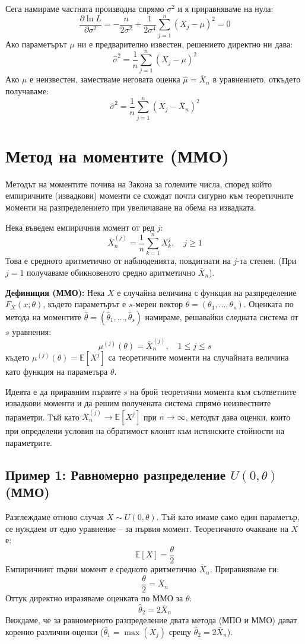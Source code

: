 \documentclass{article}
\begin{document}
Сега намираме частната производна спрямо $\sigma^2$ и я приравняваме на нула:
\[
    \frac{\partial \ln L}{\partial \sigma^2} = -\frac{n}{2\sigma^2} + \frac{1}{2\sigma^4} \sum_{j=1}^n (X_j - \mu)^2 = 0
\]
Ако параметърът $\mu$ ни е предварително известен, решението директно ни дава:
\[
    \hat{\sigma}^2 = \frac{1}{n} \sum_{j=1}^n (X_j - \mu)^2
\]
Ако $\mu$ е неизвестен, заместваме неговата оценка $\hat{\mu} = \overline{X}_n$ в уравнението, откъдето получаваме:
\[
    \hat{\sigma}^2 = \frac{1}{n} \sum_{j=1}^n (X_j - \overline{X}_n)^2
\]


\section{Метод на моментите (ММО)}

Методът на моментите почива на Закона за големите числа, според който емпиричните (извадкови) моменти се схождат почти сигурно към теоретичните моменти на разпределението при увеличаване на обема на извадката.

Нека въведем емпиричния момент от ред $j$:
\[
    \bar{X}_n^{(j)} = \frac{1}{n} \sum_{k=1}^n X_k^j, \quad j \ge 1
\]
Това е средното аритметично от наблюденията, повдигнати на $j$-та степен. (При $j=1$ получаваме обикновеното средно аритметично $\bar{X}_n$).

\textbf{Дефиниция (ММО):} Нека $X$ е случайна величина с функция на разпределение $F_X(x; \theta)$, където параметърът е $s$-мерен вектор $\theta = (\theta_1, \dots, \theta_s)$. Оценката по метода на моментите $\hat{\theta} = (\hat{\theta}_1, \dots, \hat{\theta}_s)$ намираме, решавайки следната система от $s$ уравнения:
\[
    \mu^{(j)}(\theta) = \bar{X}_n^{(j)}, \quad 1 \le j \le s 
\]
където $\mu^{(j)}(\theta) = \mathbb{E}[X^j]$ са теоретичните моменти на случайната величина като функция на параметьра $\theta$. 

Идеята е да приравним първите $s$ на брой теоретични момента към съответните извадкови моменти и да решим получената система спрямо неизвестните параметри. Тъй като $\bar{X}_n^{(j)} \to \mathbb{E}[X^j]$ при $n \to \infty$, методът дава оценки, които при определени условия на обратимост клонят към истинските стойности на параметрите.

\subsection{Пример 1: Равномерно разпределение $U(0, \theta)$ (ММО)}

Разглеждаме отново случая $X \sim U(0, \theta)$. Тъй като имаме само един параметър, се нуждаем от едно уравнение -- за първия момент.
Теоретичното очакване на $X$ е:
\[
    \mathbb{E}[X] = \frac{\theta}{2}
\]
Емпиричният първи момент е средното аритметично $\bar{X}_n$. Приравняваме ги:
\[
    \frac{\theta}{2} = \bar{X}_n
\]
Оттук директно изразяваме оценката по ММО за $\theta$:
\[
    \hat{\theta}_2 = 2 \bar{X}_n
\]
Виждаме, че за равномерното разпределение двата метода (МПО и ММО) дават коренно различни оценки ($\hat{\theta}_1 = \max(X_j)$ срещу $\hat{\theta}_2 = 2\bar{X}_n$).
\end{document}
